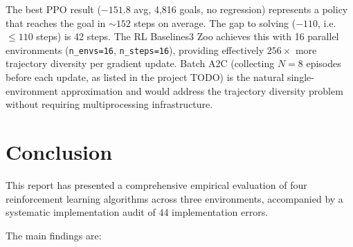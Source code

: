 \documentclass[a4paper,12pt]{article}
\begin{document}
The best PPO result ($-151.8$ avg, 4,816 goals, no regression) represents a policy that reaches the goal in $\sim152$ steps on average. The gap to solving ($-110$, i.e.\ $\leq110$ steps) is 42 steps. The RL Baselines3 Zoo achieves this with 16 parallel environments (\texttt{n\_envs=16}, \texttt{n\_steps=16}), providing effectively $256\times$ more trajectory diversity per gradient update. Batch A2C (collecting $N=8$ episodes before each update, as listed in the project TODO) is the natural single-environment approximation and would address the trajectory diversity problem without requiring multiprocessing infrastructure.

\section{Conclusion}
\label{sec:conclusion}

This report has presented a comprehensive empirical evaluation of four reinforcement learning algorithms across three environments, accompanied by a systematic implementation audit of 44 implementation errors.

The main findings are:
\end{document}
